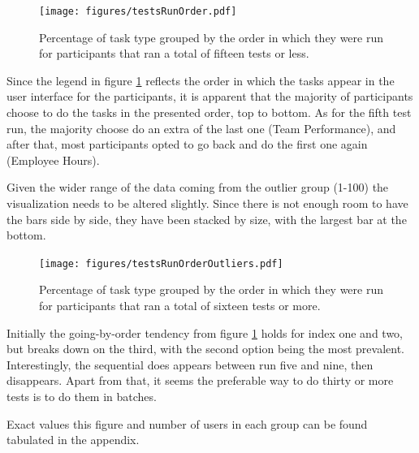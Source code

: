 \documentclass[nofilelist,dvipsnames]{cslthse-msc}
\begin{document}
				\begin{figure}[ht!]
					\centering
					\texttt{[image: figures/testsRunOrder.pdf]}
          \caption{
            Percentage of task type grouped by the order in which they were
            run for participants that ran a total of fifteen tests or less.
          }
          \label{label_testsRunOrder}
        \end{figure}

        Since the legend in figure \ref{label_testsRunOrder} reflects the order
        in which the tasks appear in the user interface for the participants,
        it is apparent that the majority of participants choose to do the tasks
        in the presented order, top to bottom. As for the fifth test run, the
        majority choose do an extra of the last one (Team Performance), and
        after that, most participants opted to go back and do the first one
        again (Employee Hours).

        Given the wider range of the data coming from the outlier group (1-100)
        the visualization needs to be altered slightly. Since there is not
        enough room to have the bars side by side, they have been stacked by
        size, with the largest bar at the bottom.
				\begin{figure}[ht!]
					\centering
					\texttt{[image: figures/testsRunOrderOutliers.pdf]}
          \caption{
            Percentage of task type grouped by the order in which they were
            run for participants that ran a total of sixteen tests or more.
          }
				\end{figure}

        Initially the going-by-order tendency from figure
        \ref{label_testsRunOrder} holds for index one and two, but breaks down
        on the third, with the second option being the most prevalent.
        Interestingly, the sequential does appears between run five and nine,
        then disappears. Apart from that, it seems the preferable way to do
        thirty or more tests is to do them in batches.

        Exact values this figure and number of users in each group can be found
        tabulated in the appendix. 

%
\end{document}
